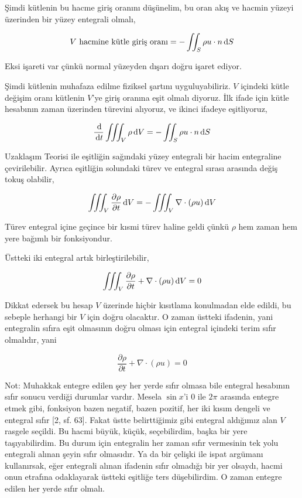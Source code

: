 \documentclass[12pt,fleqn]{article}\usepackage{../../common}
\begin{document}
Şimdi kütlenin bu hacme giriş oranını düşünelim, bu oran akış ve hacmin
yüzeyi üzerinden bir yüzey entegrali olmalı,

$$
V \textrm{ hacmine kütle giriş oranı} = - \iint_S \rho u \cdot n \,\mathrm{d} S
$$

Eksi işareti var çünkü normal yüzeyden dışarı doğru işaret ediyor.

Şimdi kütlenin muhafaza edilme fiziksel şartını uyguluyabiliriz. $V$ içindeki
kütle değişim oranı kütlenin $V$'ye giriş oranına eşit olmalı diyoruz. İlk ifade
için kütle hesabının zaman üzerinden türevini alıyoruz, ve ikinci ifadeye
eşitliyoruz,

$$
\frac{\,\mathrm{d}}{\,\mathrm{d} t}  \iiint_V \rho \,\mathrm{d} V = - \iint_S \rho u \cdot n \,\mathrm{d} S
$$

Uzaklaşım Teorisi ile eşitliğin sağındaki yüzey entegrali bir hacim entegraline
çevirilebilir. Ayrıca eşitliğin solundaki türev ve entegral sırası arasında
değiş tokuş olabilir,

$$
\iiint_V \frac{\partial \rho}{\partial t} \,\mathrm{d} V = - \iiint_V \nabla \cdot (\rho u ) \,\mathrm{d} V
$$

Türev entegral içine geçince bir kısmi türev haline geldi çünkü $\rho$ hem zaman
hem yere bağımlı bir fonksiyondur.

Üstteki iki entegral artık birleştirilebilir,

$$
\iiint_V \frac{\partial \rho}{\partial t} + \nabla \cdot (\rho u ) \,\mathrm{d} V = 0
$$

Dikkat edersek bu hesap $V$ üzerinde hiçbir kısıtlama konulmadan elde edildi,
bu sebeple herhangi bir $V$ için doğru olacaktır. O zaman üstteki ifadenin,
yani entegralin sıfıra eşit olmasının doğru olması için entegral içindeki
terim sıfır olmalıdır, yani 

$$
\frac{\partial \rho}{\partial t} + \nabla \cdot (\rho u ) = 0
$$

Not: Muhakkak entegre edilen şey her yerde sıfır olmasa bile entegral hesabının
sıfır sonucu verdiği durumlar vardır. Mesela $\sin x$'i 0 ile $2\pi$ arasında
entegre etmek gibi, fonksiyon bazen negatif, bazen pozitif, her iki kısım
dengeli ve entegral sıfır [2, sf. 63]. Fakat üstte belirttiğimiz gibi entegral
aldığımız alan $V$ rasgele seçildi. Bu hacmi büyük, küçük, seçebilirdim, başka
bir yere taşıyabilirdim. Bu durum için entegralin her zaman sıfır vermesinin tek
yolu entegrali alınan şeyin sıfır olmasıdır. Ya da bir çelişki ile ispat
argümanı kullanırsak, eğer entegrali alınan ifadenin sıfır olmadığı bir yer
olsaydı, hacmi onun etrafına odaklayarak üstteki eşitliğe ters düşebilirdim. O
zaman entegre edilen her yerde sıfır olmalı.
\end{document}
